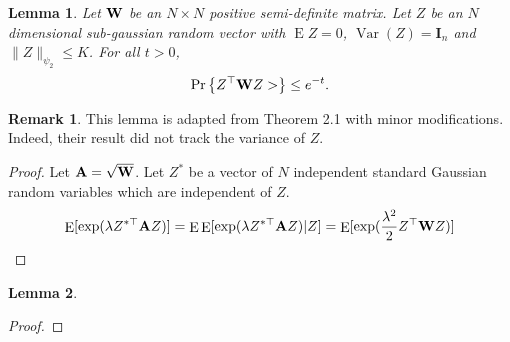 \documentclass[11pt]{article}
\DeclareMathOperator{\myE}{E}
\DeclareMathOperator{\myVar}{Var}
\newcommand{\BA}{\mathbf{A}}    \newcommand{\BB}{\mathbf{B}}    \newcommand{\BC}{\mathbf{C}}    \newcommand{\BD}{\mathbf{D}}    \newcommand{\BE}{\mathbf{E}}    \newcommand{\BF}{\mathbf{F}}    \newcommand{\BG}{\mathbf{G}}    \newcommand{\BH}{\mathbf{H}}    \newcommand{\BI}{\mathbf{I}}    \newcommand{\BJ}{\mathbf{J}}    \newcommand{\BK}{\mathbf{K}}    \newcommand{\BL}{\mathbf{L}}
\theoremstyle{plain}
\newtheorem{lemma}{\quad\quad Lemma}
\theoremstyle{definition}
\newtheorem{remark}{\quad\quad Remark}
\theoremstyle{remark}
\begin{document}
\begin{appendices}
\begin{lemma}
    Let $\mathbf{W}$ be an $N\times N$ positive semi-definite matrix.
    Let $Z$ be an $N$ dimensional sub-gaussian random vector with $\myE Z=0$, $\myVar (Z)= \BI_n$ and $\|Z\|_{\psi_2} \leq K$.
    For all $t>0$,
    \begin{equation*}
        \Pr\left\{
            Z^\top \mathbf{W} Z >
        \right\} 
        \leq e^{-t}.
    \end{equation*}
\end{lemma}
\begin{remark}
    This lemma is adapted from \cite{Hsu2012} Theorem 2.1 with minor modifications.
    Indeed, their result did not track the variance of $Z$.
\end{remark}
\begin{proof}
    Let $\BA=\sqrt{\BW}$.
    Let $Z^*$ be a vector of $N$ independent standard Gaussian random variables which are independent of $Z$.  
    \begin{equation*}
        \myE [\exp (\lambda Z^{*\top } \BA Z)]
        =
        \myE\myE [\exp (\lambda Z^{*\top } \BA Z)| Z]
        =\myE[\exp (\frac{\lambda^2}{2} Z^\top \BW Z)]
    \end{equation*}
\end{proof}
\begin{lemma}
    
\end{lemma}
\begin{proof}
    
\end{proof}


\end{appendices}
\end{document}
